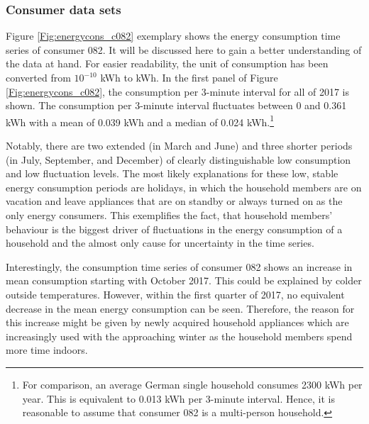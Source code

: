 \subsubsection{Consumer data sets}

Figure \ref{Fig:energycons_c082} exemplary shows the energy consumption time series of consumer 082. It will be discussed here to gain a better understanding of the data at hand. For easier readability, the unit of consumption has been converted from $10^{-10}$ kWh to kWh. In the first panel of Figure \ref{Fig:energycons_c082}, the consumption per 3-minute interval for all of 2017 is shown. The consumption per 3-minute interval fluctuates between 0 and 0.361 kWh with a mean of 0.039 kWh and a median of 0.024 kWh.\footnote{For comparison, an average German single household consumes 2300 kWh per year. This is equivalent to 0.013 kWh per 3-minute interval. Hence, it is reasonable to assume that consumer 082 is a multi-person household.}

Notably, there are two extended (in March and June) and three shorter periods (in July, September, and December) of clearly distinguishable low consumption and low fluctuation levels. The most likely explanations for these low, stable energy consumption periods are holidays, in which the household members are on vacation and leave appliances that are on standby or always turned on as the only energy consumers. This exemplifies the fact, that household members' behaviour is the biggest driver of fluctuations in the energy consumption of a household and the almost only cause for uncertainty in the time series.

Interestingly, the consumption time series of consumer 082 shows an increase in mean consumption starting with October 2017. This could be explained by colder outside temperatures. However, within the first quarter of 2017, no equivalent decrease in the mean energy consumption can be seen. Therefore, the reason for this increase might be given by newly acquired household appliances which are increasingly used with the approaching winter as the household members spend more time indoors.

